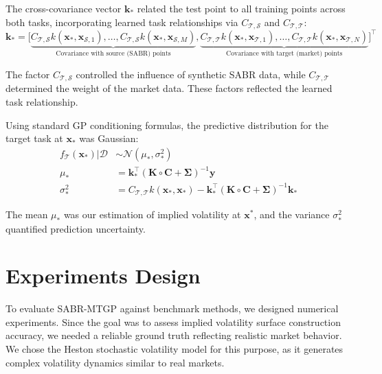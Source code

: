 \documentclass[preprint,12pt]{elsarticle}
\begin{document}
The cross-covariance vector $\mathbf{k}_\ast$ related the test point to all training points across both tasks, incorporating learned task relationships via $C_{\mathcal{T,S}}$ and $C_{\mathcal{T,T}}$:
\begin{equation}
\mathbf{k}_\ast=
\Big[
\underbrace{C_{\mathcal{T,S}}k(\mathbf{x}_\ast,\mathbf{x}_{\mathcal{S},1}),\dots,C_{\mathcal{T,S}}k(\mathbf{x}_\ast,\mathbf{x}_{\mathcal{S},M})}_{\text{Covariance with source (SABR) points}} ,\underbrace{C_{\mathcal{T,T}}k(\mathbf{x}_\ast,\mathbf{x}_{\mathcal{T},1}),\dots,C_{\mathcal{T,T}}k(\mathbf{x}_\ast,\mathbf{x}_{\mathcal{T},N})}_{\text{Covariance with target (market) points}}
\Big]^\intercal
\end{equation}

The factor $C_{\mathcal{T,S}}$ controlled the influence of synthetic SABR data, while $C_{\mathcal{T,T}}$ determined the weight of the market data. These factors reflected the learned task relationship.

Using standard GP conditioning formulas, the predictive distribution for the target task at $\mathbf{x}_\ast$ was Gaussian:
\begin{align}
f_\mathcal{T}(\mathbf{x}_\ast) | \mathcal{D} &\sim \mathcal{N}(\mu_\ast, \sigma_\ast^2)\\
\mu_\ast &= \mathbf{k}_\ast^\intercal(\mathbf{K}\circ \mathbf{C}  + \mathbf{\Sigma})^{-1}\mathbf{y} \label{eq:pred_mean}\\
\sigma_\ast^2 &= C_{\mathcal{T,T}} k(\mathbf{x}_{\ast}, \mathbf{x}_\ast) - \mathbf{k}_\ast^\intercal(\mathbf{K}\circ \mathbf{C}  + \mathbf{\Sigma})^{-1}\mathbf{k}_\ast \label{eq:pred_var}
\end{align}

The mean $\mu_\ast$ was our estimation of implied volatility at $\mathbf{x}^\ast$, and the variance $\sigma_\ast^2$ quantified prediction uncertainty.

\section{Experiments Design} \label{sec:experiments}

To evaluate SABR-MTGP against benchmark methods, we designed numerical experiments. Since the goal was to assess implied volatility surface construction accuracy, we needed a reliable ground truth reflecting realistic market behavior. We chose the Heston stochastic volatility model \citep{heston1993closed} for this purpose, as it generates complex volatility dynamics similar to real markets.
\end{document}
